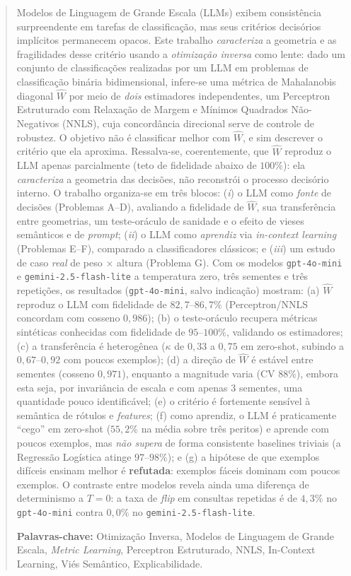 \documentclass[12pt,a4paper]{article}
\newcommand{\West}{\ensuremath{\hat{W}}}   %
\begin{document}
\begin{abstract}
Modelos de Linguagem de Grande Escala (LLMs) exibem consistência surpreendente em
tarefas de classificação, mas seus critérios decisórios implícitos permanecem opacos.
Este trabalho \emph{caracteriza} a geometria e as fragilidades desse critério usando a
\emph{otimização inversa} como lente: dado um conjunto de classificações realizadas
por um LLM em problemas de classificação binária bidimensional, infere-se uma métrica de
Mahalanobis diagonal \West{} por meio de \emph{dois} estimadores independentes, um
Perceptron Estruturado com Relaxação de Margem e Mínimos Quadrados Não-Negativos (NNLS),
cuja concordância direcional serve de controle de robustez. O objetivo não é classificar
melhor com \West{}, e sim descrever o critério que ela aproxima. Ressalva-se, coerentemente,
que \West{} reproduz o LLM apenas parcialmente (teto de fidelidade abaixo de $100\%$): ela
\emph{caracteriza} a geometria das decisões, não reconstrói o processo decisório interno. O trabalho organiza-se em
três blocos: (\emph{i}) o LLM como \emph{fonte} de decisões (Problemas A–D), avaliando a
fidelidade de \West{}, sua transferência entre geometrias, um teste-oráculo de sanidade e
o efeito de vieses semânticos e de \emph{prompt}; (\emph{ii}) o LLM como \emph{aprendiz}
via \emph{in-context learning} (Problemas E–F), comparado a classificadores clássicos;
e (\emph{iii}) um estudo de caso \emph{real} de peso $\times$ altura (Problema G).
Com os modelos \texttt{gpt-4o-mini} e \texttt{gemini-2.5-flash-lite} a temperatura zero,
três sementes e três repetições,
os resultados (\texttt{gpt-4o-mini}, salvo indicação) mostram: (a) \West{} reproduz o LLM
com fidelidade de $82{,}7$–$86{,}7\%$
(Perceptron/NNLS concordam com cosseno $0{,}986$); (b) o teste-oráculo recupera métricas
sintéticas conhecidas com fidelidade de $95$–$100\%$, validando os estimadores; (c) a
transferência é heterogênea ($\kappa$ de $0{,}33$ a $0{,}75$ em zero-shot, subindo a
$0{,}67$–$0{,}92$ com poucos exemplos); (d) a direção de \West{} é estável entre sementes
(cosseno $0{,}971$), enquanto a magnitude varia (CV $88\%$), embora esta seja, por
invariância de escala e com apenas $3$ sementes, uma quantidade pouco identificável; (e) o
critério é fortemente sensível à semântica de rótulos e \emph{features}; (f) como
aprendiz, o LLM é praticamente ``cego'' em zero-shot ($55{,}2\%$ na média sobre três
peritos)
e aprende com poucos exemplos, mas \emph{não supera} de forma consistente baselines
triviais (a Regressão Logística atinge $97$–$98\%$); e (g) a hipótese de que exemplos
difíceis ensinam melhor é
\textbf{refutada}: exemplos fáceis dominam com poucos exemplos. O contraste entre modelos
revela ainda uma diferença de determinismo a $T=0$: a taxa de \emph{flip} em consultas
repetidas é de $4{,}3\%$ no \texttt{gpt-4o-mini} contra $0{,}0\%$ no
\texttt{gemini-2.5-flash-lite}.

\smallskip\noindent\textbf{Palavras-chave:}
Otimização Inversa, Modelos de Linguagem de Grande Escala, \emph{Metric Learning},
Perceptron Estruturado, NNLS, In-Context Learning, Viés Semântico, Explicabilidade.
\end{abstract}
\end{document}
